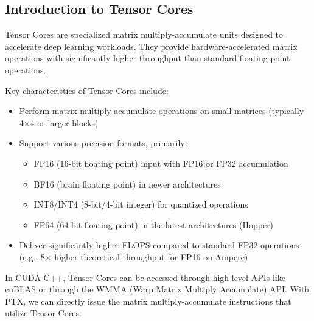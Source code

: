 \subsection{Introduction to Tensor Cores}

Tensor Cores are specialized matrix multiply-accumulate units designed to accelerate deep learning workloads. They provide hardware-accelerated matrix operations with significantly higher throughput than standard floating-point operations.

Key characteristics of Tensor Cores include:

\begin{itemize}
    \item Perform matrix multiply-accumulate operations on small matrices (typically 4×4 or larger blocks)
    \item Support various precision formats, primarily:
    \begin{itemize}
        \item FP16 (16-bit floating point) input with FP16 or FP32 accumulation
        \item BF16 (brain floating point) in newer architectures
        \item INT8/INT4 (8-bit/4-bit integer) for quantized operations
        \item FP64 (64-bit floating point) in the latest architectures (Hopper)
    \end{itemize}
    \item Deliver significantly higher FLOPS compared to standard FP32 operations (e.g., 8× higher theoretical throughput for FP16 on Ampere)
\end{itemize}

In CUDA C++, Tensor Cores can be accessed through high-level APIs like cuBLAS or through the WMMA (Warp Matrix Multiply Accumulate) API. With PTX, we can directly issue the matrix multiply-accumulate instructions that utilize Tensor Cores.


